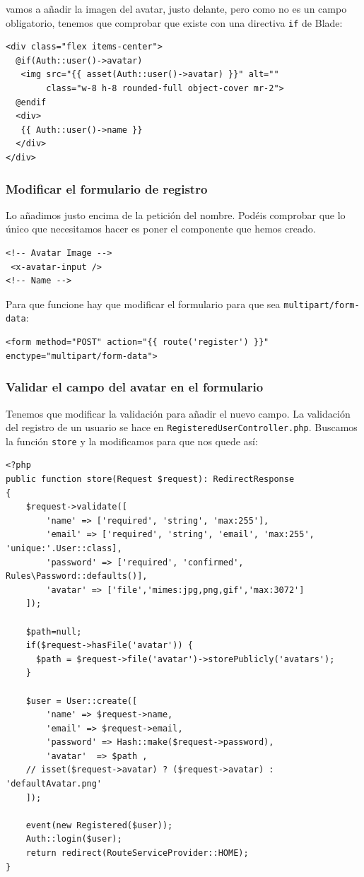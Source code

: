 \documentclass[11pt]{article}
\begin{document}
vamos a añadir la imagen del avatar, justo delante, pero como no es un
campo obligatorio, tenemos que comprobar que existe con una directiva
\texttt{if} de Blade:

\begin{verbatim}
<div class="flex items-center">
  @if(Auth::user()->avatar)
   <img src="{{ asset(Auth::user()->avatar) }}" alt=""
        class="w-8 h-8 rounded-full object-cover mr-2">
  @endif
  <div>
   {{ Auth::user()->name }}
  </div>
</div>
\end{verbatim}

\subsubsection{Modificar el formulario de registro}
\label{sec:org593d58a}
Lo añadimos justo encima de la petición del nombre. Podéis comprobar
que lo único que necesitamos hacer es poner el componente que hemos
creado.
\begin{verbatim}
<!-- Avatar Image -->
 <x-avatar-input />
<!-- Name -->
\end{verbatim}

Para que funcione hay que modificar el formulario para que
sea \texttt{multipart/form-data}:
\begin{verbatim}
<form method="POST" action="{{ route('register') }}"
enctype="multipart/form-data">
\end{verbatim}

\subsubsection{Validar el campo del avatar en el formulario}
\label{sec:org92c958c}
Tenemos que modificar la validación para añadir el nuevo campo. La
validación del registro de un usuario se hace en
\texttt{RegisteredUserController.php}. Buscamos la función \texttt{store} y la
modificamos para que nos quede así:
\begin{verbatim}
<?php
public function store(Request $request): RedirectResponse
{
    $request->validate([
        'name' => ['required', 'string', 'max:255'],
        'email' => ['required', 'string', 'email', 'max:255', 'unique:'.User::class],
        'password' => ['required', 'confirmed', Rules\Password::defaults()],
        'avatar' => ['file','mimes:jpg,png,gif','max:3072']
    ]);

    $path=null;
    if($request->hasFile('avatar')) {
      $path = $request->file('avatar')->storePublicly('avatars');
    }

    $user = User::create([
        'name' => $request->name,
        'email' => $request->email,
        'password' => Hash::make($request->password),
        'avatar'  => $path ,
    // isset($request->avatar) ? ($request->avatar) : 'defaultAvatar.png'
    ]);

    event(new Registered($user));
    Auth::login($user);
    return redirect(RouteServiceProvider::HOME);
}
\end{verbatim}
\end{document}
